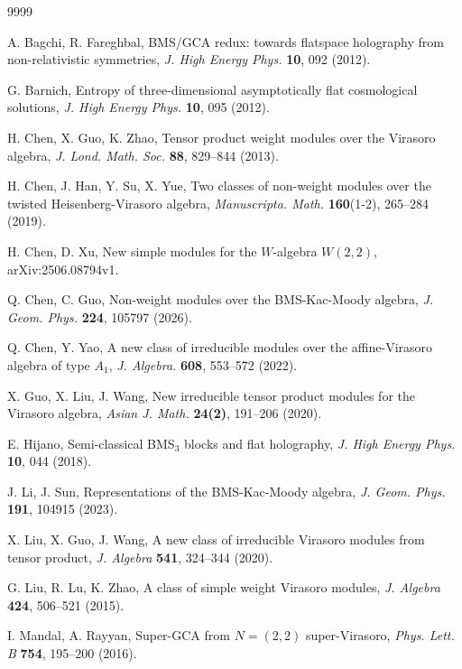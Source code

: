 \documentclass[12pt,leqno,amscd,amsfonts,amssymb]{amsart}
\numberwithin{equation}{section}
\begin{document}
\begin{thebibliography}{9999}

 A. Bagchi, R. Fareghbal, BMS/GCA redux: towards flatspace holography from non-relativistic symmetries, {\it J. High Energy Phys.}   {\bf 10}, 092 (2012).

 G. Barnich, Entropy of three-dimensional asymptotically flat cosmological solutions, {\it J. High Energy Phys.}  {\bf 10}, 095 (2012).

 H. Chen,  X. Guo, K. Zhao, Tensor product weight modules over the Virasoro algebra, {\it J. Lond. Math. Soc.} {\bf 88}, 829--844 (2013).

 H. Chen,  J. Han, Y. Su, X. Yue, Two classes of non-weight modules over the twisted Heisenberg-Virasoro algebra, {\it Manuscripta. Math.} {\bf 160}(1-2), 265--284 (2019).

 H. Chen,  D. Xu, New simple modules for the $W$-algebra $W(2,2)$, arXiv:2506.08794v1.

 Q. Chen, C. Guo, Non-weight modules over the BMS-Kac-Moody algebra, {\it J. Geom. Phys.} {\bf 224}, 105797 (2026).

 Q. Chen, Y. Yao, A new class of irreducible modules over the affine-Virasoro algebra of type $A_{1}$, {\it J. Algebra.} {\bf 608}, 553--572 (2022).

 X. Guo, X. Liu, J. Wang, New irreducible tensor product modules for the Virasoro algebra, {\it Asian J. Math.} {\bf 24(2)}, 191--206 (2020).

%
 E. Hijano, Semi-classical BMS$_3$ blocks and flat holography, {\it J. High Energy Phys.}   {\bf 10}, 044 (2018).


 J. Li, J. Sun, Representations of the BMS-Kac-Moody algebra, {\it J. Geom. Phys.} {\bf 191}, 104915 (2023).


 X. Liu, X. Guo, J. Wang, A new class of irreducible Virasoro modules from tensor product, {\it J. Algebra} {\bf 541}, 324--344 (2020).

 G. Liu, R. Lu, K. Zhao, A class of simple weight Virasoro modules, {\it J. Algebra} {\bf 424}, 506--521 (2015).

 I. Mandal, A. Rayyan, Super-GCA from $N=(2,2)$ super-Virasoro, {\it Phys. Lett. B}  {\bf 754}, 195--200 (2016).


\end{thebibliography}
\end{document}
